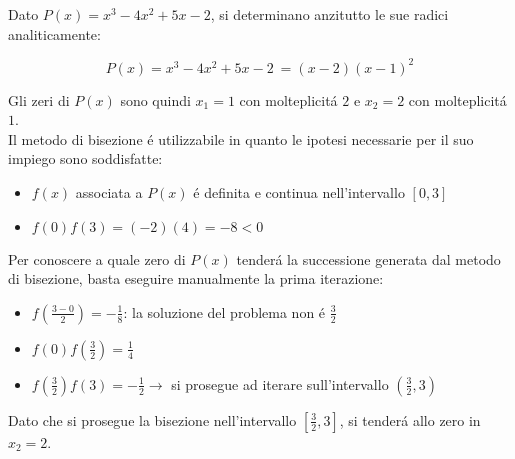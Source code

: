 \begin{center}
\footnotesize\noindent{}\end{center}

\noindent Dato \(P(x) = x^3 - 4x^2 + 5x - 2\), si determinano anzitutto le sue radici analiticamente:

\[
P(x) = x^3 - 4x^2 + 5x - 2\ = (x-2)(x-1)^2
\]

\noindent Gli zeri di \(P(x)\) sono quindi \(x_1=1\) con molteplicit\'a \(2\) e \(x_2=2\) con molteplicit\'a \(1\).\\

\noindent Il metodo di bisezione \'e utilizzabile in quanto le ipotesi necessarie per il suo impiego sono soddisfatte:

\begin{itemize}

\item \(f(x)\) associata a \(P(x)\) \'e definita e continua nell'intervallo \([0,3]\)
\item \(f(0)f(3) = (-2)(4) = -8 < 0\)

\end{itemize}

\noindent Per conoscere a quale zero di \(P(x)\) tender\'a la successione generata dal metodo di bisezione, basta eseguire manualmente la prima iterazione:

\begin{itemize}
\item \(f(\frac{3-0}{2}) = -\frac{1}{8}\): la soluzione del problema non \'e \(\frac{3}{2}\)
\item \(f(0)f(\frac{3}{2}) = \frac{1}{4}\)
\item \(f(\frac{3}{2})f(3) = -\frac{1}{2} \rightarrow \) si prosegue ad iterare sull'intervallo \((\frac{3}{2}, 3)\)
\end{itemize}

\noindent Dato che si prosegue la bisezione nell'intervallo \([\frac{3}{2}, 3]\), si tender\'a allo zero in \(x_2=2\).

